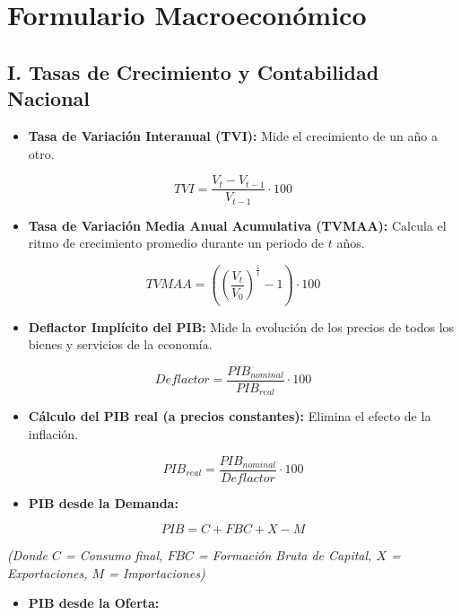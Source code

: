 \section{Formulario Macroeconómico}

\subsection*{I. Tasas de Crecimiento y Contabilidad Nacional}

\begin{itemize}
	\item \textbf{Tasa de Variación Interanual (TVI):} Mide el crecimiento de un año a otro.
\end{itemize}

\[
TVI = \frac{V_t - V_{t-1}}{V_{t-1}} \cdot 100
\]

\begin{itemize}
	\item \textbf{Tasa de Variación Media Anual Acumulativa (TVMAA):} Calcula el ritmo de crecimiento promedio durante un periodo de $t$ años.
\end{itemize}

\[
TVMAA = \left( \left( \frac{V_t}{V_0} \right)^{\frac{1}{t}} - 1 \right) \cdot 100
\]

\begin{itemize}
	\item \textbf{Deflactor Implícito del PIB:} Mide la evolución de los precios de todos los bienes y servicios de la economía.
\end{itemize}

\[
Deflactor = \frac{PIB_{nominal}}{PIB_{real}} \cdot 100
\]

\begin{itemize}
	\item \textbf{Cálculo del PIB real (a precios constantes):} Elimina el efecto de la inflación.
\end{itemize}

\[
PIB_{real} = \frac{PIB_{nominal}}{Deflactor} \cdot 100
\]

\begin{itemize}
	\item \textbf{PIB desde la Demanda:}
\end{itemize}

\[
PIB = C + FBC + X - M
\]

\textit{(Donde $C$ = Consumo final, $FBC$ = Formación Bruta de Capital, $X$ = Exportaciones, $M$ = Importaciones)}

\begin{itemize}
	\item \textbf{PIB desde la Oferta:}
\end{itemize}

